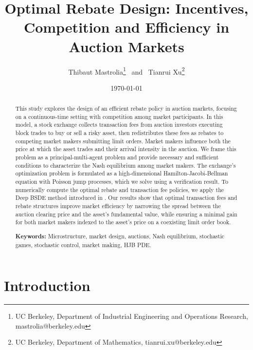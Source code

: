 \documentclass[12pt]{article}
\title{Optimal Rebate Design: Incentives, Competition and Efficiency in Auction Markets}
\author{Thibaut {\sc Mastrolia}\footnote{UC Berkeley, Department of Industrial Engineering and Operations Research, mastrolia@berkeley.edu} ~and~ Tianrui {\sc Xu}\footnote{UC Berkeley, Department of Mathematics, tianrui.xu@berkeley.edu}}
\date{\today}
\begin{document}
\pagestyle{headings}	
\newpage
\setcounter{page}{1}
\renewcommand{\thepage}{\arabic{page}}


	
	
\setlength{\parskip}{0.5em}
	
\maketitle

\begin{abstract}
This study explores the design of an efficient rebate policy in auction markets, focusing on a continuous-time setting with competition among market participants. In this model, a stock exchange collects transaction fees from auction investors executing block trades to buy or sell a risky asset, then redistributes these fees as rebates to competing market makers submitting limit orders. Market makers influence both the price at which the asset trades and their arrival intensity in the auction. We frame this problem as a principal-multi-agent problem and provide necessary and sufficient conditions to characterize the Nash equilibrium among market makers. The exchange’s optimization problem is formulated as a high-dimensional Hamilton-Jacobi-Bellman equation with Poisson jump processes, which we solve using a verification result. To numerically compute the optimal rebate and transaction fee policies, we apply the Deep BSDE method introduced in \cite{henry2017deep,han2020convergence,dayanikli2025machine}. Our results show that optimal transaction fees and rebate structures improve market efficiency by narrowing the spread between the auction clearing price and the asset’s fundamental value, while ensuring a minimal gain for both market makers indexed to the asset’s price on a coexisting limit order book.


\textbf{Keywords: }{Microstructure, market design, auctions, Nash equilibrium, stochastic games, stochastic control, market making, HJB PDE.}

\end{abstract}



\section{Introduction}
\label{intro}
\end{document}
